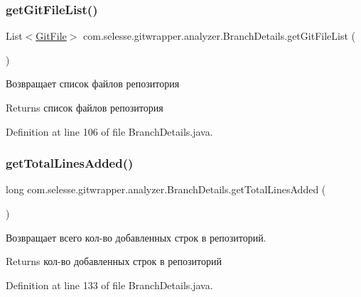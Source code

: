 \subsubsection{\texorpdfstring{get\+Git\+File\+List()}{getGitFileList()}}
{\footnotesize\ttfamily List$<$\hyperlink{classcom_1_1selesse_1_1gitwrapper_1_1myobjects_1_1_git_file}{Git\+File}$>$ com.\+selesse.\+gitwrapper.\+analyzer.\+Branch\+Details.\+get\+Git\+File\+List (\begin{DoxyParamCaption}{ }\end{DoxyParamCaption})}

Возвращает список файлов репозитория

\begin{DoxyReturn}{Returns}
список файлов репозитория 
\end{DoxyReturn}


Definition at line 106 of file Branch\+Details.\+java.

\mbox{\label{classcom_1_1selesse_1_1gitwrapper_1_1analyzer_1_1_branch_details_a6dcd7b97245632eded54cf6a8c3c6a6b}} 
\subsubsection{\texorpdfstring{get\+Total\+Lines\+Added()}{getTotalLinesAdded()}}
{\footnotesize\ttfamily long com.\+selesse.\+gitwrapper.\+analyzer.\+Branch\+Details.\+get\+Total\+Lines\+Added (\begin{DoxyParamCaption}{ }\end{DoxyParamCaption})}

Возвращает всего кол-\/во добавленных строк в репозиторий.

\begin{DoxyReturn}{Returns}
кол-\/во добавленных строк в репозиторий 
\end{DoxyReturn}


Definition at line 133 of file Branch\+Details.\+java.

\mbox{\label{classcom_1_1selesse_1_1gitwrapper_1_1analyzer_1_1_branch_details_a595a31a33a7f011a55d7bd6d41e580b9}} 
